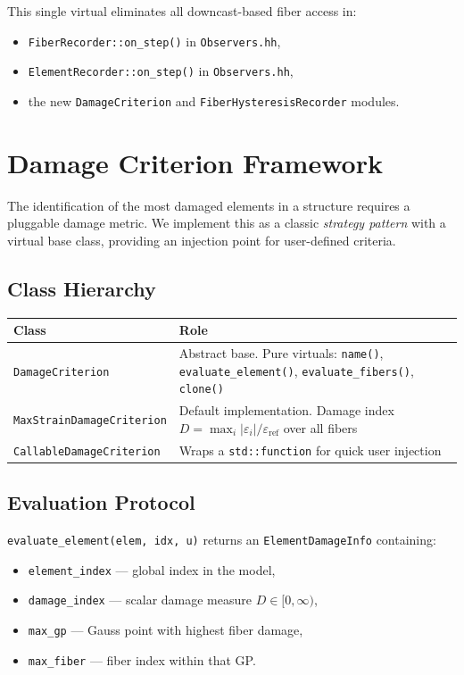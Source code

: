 This single virtual eliminates all downcast-based fiber access in:
\begin{itemize}
  \item \texttt{FiberRecorder::on\_step()} in \texttt{Observers.hh},
  \item \texttt{ElementRecorder::on\_step()} in \texttt{Observers.hh},
  \item the new \texttt{DamageCriterion} and
        \texttt{FiberHysteresisRecorder} modules.
\end{itemize}


\section{Damage Criterion Framework}
\label{sec:seismic-damage-criterion}

The identification of the most damaged elements in a structure
requires a pluggable damage metric.  We implement this as a
classic \emph{strategy pattern} with a virtual base class,
providing an injection point for user-defined criteria.

\subsection{Class Hierarchy}

\begin{center}
\begin{tabular}{lp{8cm}}
  \toprule
  Class & Role \\
  \midrule
  \texttt{DamageCriterion} & Abstract base.
    Pure virtuals: \texttt{name()}, \texttt{evaluate\_element()},
    \texttt{evaluate\_fibers()}, \texttt{clone()} \\
  \texttt{MaxStrainDamageCriterion} & Default implementation.
    Damage index $D = \max_i |\varepsilon_i| / \varepsilon_{\text{ref}}$
    over all fibers \\
  \texttt{CallableDamageCriterion} & Wraps a \texttt{std::function}
    for quick user injection \\
  \bottomrule
\end{tabular}
\end{center}

\subsection{Evaluation Protocol}

\texttt{evaluate\_element(elem, idx, u)} returns an
\texttt{ElementDamageInfo} containing:
%
\begin{itemize}
  \item \texttt{element\_index} --- global index in the model,
  \item \texttt{damage\_index} --- scalar damage measure $D \in [0, \infty)$,
  \item \texttt{max\_gp} --- Gauss point with highest fiber damage,
  \item \texttt{max\_fiber} --- fiber index within that GP.
\end{itemize}


